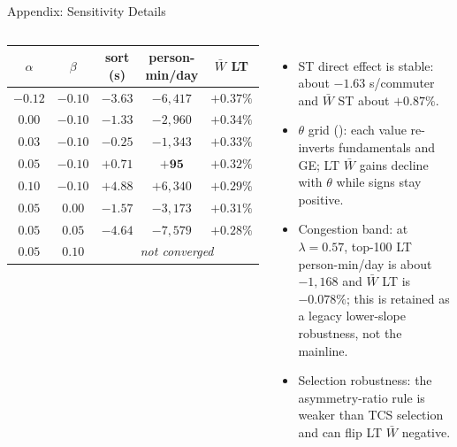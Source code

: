 \documentclass[11pt,aspectratio=169]{beamer}
\newcommand{\app}[1]{\allowbreak\hspace{0.25em}\hyperlink{#1}{\beamergotobutton{details}}}
\newcommand{\navback}[1]{\par\vspace{0.35em}\noindent\hfill\hyperlink{#1}{\beamerreturnbutton{back}}}
\begin{document}
\begin{frame}[label=appsensdetail]{Appendix: Sensitivity Details}
\scriptsize
\begin{columns}[T,onlytextwidth]
\begin{flushright}
\setlength{\tabcolsep}{3.5pt}
\begin{tabular}{ccccc}
\toprule
$\alpha$ & $\beta$ & sort (s) & person-min/day & $\bar W$ LT \\
\midrule
$-0.12$ & $-0.10$ & $-3.63$ & $-6{,}417$ & $+0.37\%$ \\
$0.00$ & $-0.10$ & $-1.33$ & $-2{,}960$ & $+0.34\%$ \\
$0.03$ & $-0.10$ & $-0.25$ & $-1{,}343$ & $+0.33\%$ \\
$\mathbf{0.05}$ & $\mathbf{-0.10}$ & $\mathbf{+0.71}$ & $\mathbf{+95}$ & $\mathbf{+0.32\%}$ \\
$0.10$ & $-0.10$ & $+4.88$ & $+6{,}340$ & $+0.29\%$ \\
$0.05$ & $0.00$ & $-1.57$ & $-3{,}173$ & $+0.31\%$ \\
$0.05$ & $0.05$ & $-4.64$ & $-7{,}579$ & $+0.28\%$ \\
$0.05$ & $0.10$ & \multicolumn{3}{c}{\emph{not converged}} \\
\bottomrule
\end{tabular}
\end{flushright}
\begin{itemize}\footnotesize
  \item ST direct effect is stable: about $-1.63$ s/commuter and $\bar W$ ST about $+0.87\%$.
  \item $\theta$ grid (\app{appsens_theta}): each value re-inverts fundamentals and GE; LT $\bar W$ gains decline with $\theta$ while signs stay positive.
  \item Congestion band: at $\lambda=0.57$, top-100 LT person-min/day is about $-1{,}168$ and $\bar W$ LT is $-0.078\%$; this is retained as a legacy lower-slope robustness, not the mainline.
  \item Selection robustness: the asymmetry-ratio rule is weaker than TCS selection and can flip LT $\bar W$ negative.
\end{itemize}
\end{columns}
\navback{appsens}
\end{frame}
\end{document}
